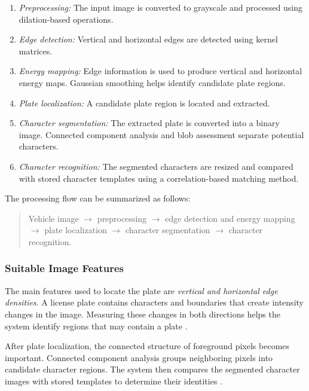\documentclass[conference]{IEEEtran}
\begin{document}
	\begin{enumerate}
		\item \textit{Preprocessing:} The input image is converted to
		grayscale and processed using dilation-based operations.
		
		\item \textit{Edge detection:} Vertical and horizontal edges are
		detected using kernel matrices.
		
		\item \textit{Energy mapping:} Edge information is used to produce
		vertical and horizontal energy maps. Gaussian smoothing helps
		identify candidate plate regions.
		
		\item \textit{Plate localization:} A candidate plate region is
		located and extracted.
		
		\item \textit{Character segmentation:} The extracted plate is
		converted into a binary image. Connected component analysis and
		blob assessment separate potential characters.
		
		\item \textit{Character recognition:} The segmented characters are
		resized and compared with stored character templates using a
		correlation-based matching method.
	\end{enumerate}
	
	The processing flow can be summarized as follows:
	
	\begin{quote}
		Vehicle image $\rightarrow$ preprocessing $\rightarrow$ edge detection
		and energy mapping $\rightarrow$ plate localization $\rightarrow$
		character segmentation $\rightarrow$ character recognition.
	\end{quote}
	
	\subsubsection{Suitable Image Features}
	
	The main features used to locate the plate are \textit{vertical and
		horizontal edge densities}. A license plate contains characters and
	boundaries that create intensity changes in the image. Measuring these
	changes in both directions helps the system identify regions that may
	contain a plate \cite{arafat2020}.
	
	After plate localization, the connected structure of foreground pixels
	becomes important. Connected component analysis groups neighboring
	pixels into candidate character regions. The system then compares the
	segmented character images with stored templates to determine their
	identities \cite{arafat2020}.
	
\end{document}
